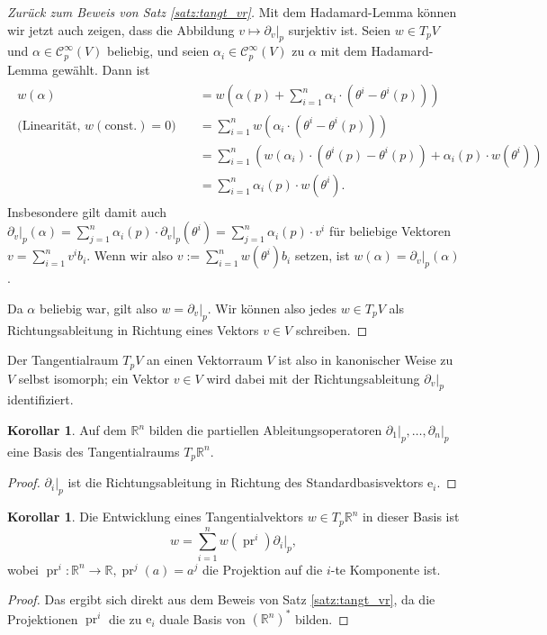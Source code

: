 \documentclass[a4paper]{scrreprt}
\numberwithin{equation}{chapter}
\newcommand{\e}{\mathrm{e}}
\DeclareMathOperator{\pr}{pr}
\newcommand{\sC}{\mathcal{C}^{\infty}}
\theoremstyle{definition}
\newtheorem{kor}[defn]{Korollar}
\begin{document}
\begin{proof}[Zurück zum Beweis von Satz \ref{satz:tangt_vr}]
	Mit dem Hadamard-Lemma können wir jetzt auch zeigen, dass die Abbildung $v \mapsto \left.\partial_v\right|_p$ surjektiv ist. Seien $w \in T_pV$ und $\alpha \in \sC_p(V)$ beliebig, und seien $\alpha_i \in \sC_p(V)$ zu $\alpha$ mit dem Hadamard-Lemma gewählt. Dann ist
	\begin{align}\begin{split} \label{eq:pf_tangt_vr}
		w(\alpha) &= w\left(\alpha(p) + \sum_{i=1}^n \alpha_i \cdot (\theta^i - \theta^i(p))\right)\\
		\text{(Linearität, $w(\text{const.}) = 0$)} \quad &= \sum_{i=1}^n w(\alpha_i \cdot (\theta^i - \theta^i(p)))\\
		&= \sum_{i=1}^n \left( w(\alpha_i) \cdot (\theta^i(p) - \theta^i(p)) + \alpha_i(p) \cdot w(\theta^i) \right)\\
		&= \sum_{i=1}^n \alpha_i(p) \cdot w(\theta^i).
	\end{split}\end{align}
	Insbesondere gilt damit auch $\left.\partial_v\right|_p (\alpha) = \sum_{j=1}^n \alpha_i(p) \cdot \left.\partial_v\right|_p (\theta^i) = \sum_{j=1}^n \alpha_i(p) \cdot v^i$ für beliebige Vektoren $v = \sum_{i=1}^n v^i b_i$. Wenn wir also $v := \sum_{i=1}^n w(\theta^i) b_i$ setzen, ist $w(\alpha) = \left.\partial_v\right|_p (\alpha)$.

	Da $\alpha$ beliebig war, gilt also $w = \left.\partial_v\right|_p$. Wir können also jedes $w \in T_pV$ als Richtungsableitung in Richtung eines Vektors $v\in V$ schreiben.
\end{proof}

Der Tangentialraum $T_pV$ an einen Vektorraum $V$ ist also in kanonischer Weise zu $V$ selbst isomorph; ein Vektor $v \in V$ wird dabei mit der Richtungsableitung $\left.\partial_v\right|_p$ identifiziert.

\begin{kor}
	Auf dem $\mathbb R^n$ bilden die partiellen Ableitungsoperatoren $\left.\partial_1\right|_p, \dots, \left.\partial_n\right|_p$ eine Basis des Tangentialraums $T_p\mathbb R^n$.

	\begin{proof}
		$\left.\partial_i\right|_p$ ist die Richtungsableitung in Richtung des Standardbasisvektors $\e_i$.
	\end{proof}
\end{kor}

\begin{kor} \label{kor:entw_tangt_Rn}
	Die Entwicklung eines Tangentialvektors $w \in T_p\mathbb R^n$ in dieser Basis ist
	\[w = \sum_{i=1}^n w(\pr^i) \left.\partial_i\right|_p,\]
	wobei $\pr^i\colon \mathbb R^n \to \mathbb R, \pr^j(a) = a^j$ die Projektion auf die $i$-te Komponente ist.

	\begin{proof}
		Das ergibt sich direkt aus dem Beweis von Satz \ref{satz:tangt_vr}, da die Projektionen $\pr^i$ die zu $\e_i$ duale Basis von $(\mathbb R^n)^*$ bilden.
	\end{proof}
\end{kor}
\end{document}

